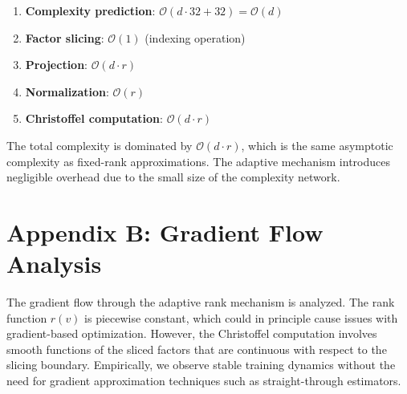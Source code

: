 \documentclass[12pt]{article}
\begin{document}
\begin{enumerate}
\item \textbf{Complexity prediction}: $\mathcal{O}(d \cdot 32 + 32) = \mathcal{O}(d)$
\item \textbf{Factor slicing}: $\mathcal{O}(1)$ (indexing operation)
\item \textbf{Projection}: $\mathcal{O}(d \cdot r)$
\item \textbf{Normalization}: $\mathcal{O}(r)$
\item \textbf{Christoffel computation}: $\mathcal{O}(d \cdot r)$
\end{enumerate}

The total complexity is dominated by $\mathcal{O}(d \cdot r)$, which is the same asymptotic complexity as fixed-rank approximations. The adaptive mechanism introduces negligible overhead due to the small size of the complexity network.

\section*{Appendix B: Gradient Flow Analysis}

The gradient flow through the adaptive rank mechanism is analyzed. The rank function $r(v)$ is piecewise constant, which could in principle cause issues with gradient-based optimization. However, the Christoffel computation involves smooth functions of the sliced factors that are continuous with respect to the slicing boundary. Empirically, we observe stable training dynamics without the need for gradient approximation techniques such as straight-through estimators.
\end{document}
